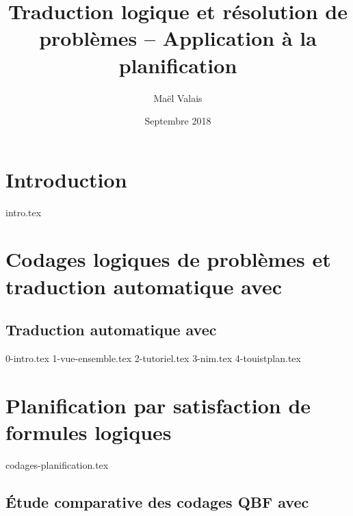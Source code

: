 \documentclass[a4paper,12pt,oneside]{extbook}
\title{Traduction logique et résolution de problèmes -- Application à la planification}
\author{Maël Valais}
\date{Septembre 2018}
\begin{document}
\tableofcontents

\chapter{Introduction}\label{chap:intro}
{intro.tex}



\chapter{Codages logiques de problèmes et traduction automatique avec \touist}\label{chap:codages}

\section{Traduction automatique avec \touist}\label{chap:touist}
{0-intro.tex}
{1-vue-ensemble.tex}
{2-tutoriel.tex}
{3-nim.tex}
{4-touistplan.tex}

\chapter{Planification par satisfaction de formules logiques}
{codages-planification.tex}

\section{Étude comparative des codages QBF avec \touist} %
\end{document}

